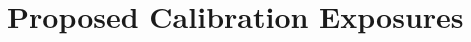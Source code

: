%
%
\section{Proposed Calibration Exposures}

\begingroup                             %
\newcommand{\DspotProjector}{D_{\mbox{\tiny spot}}} %
\newcommand{\OverfillFactor}{f_D}                   %
\newcommand{\DlambdaFilter}{\Delta_\lambda}         %
\newcommand{\DlambdaFlat}{\Delta_{\lambda,\mbox{\tiny flat}}}   %
\newcommand{\DlambdaOffset}{\Delta_{\lambda,\mbox{\tiny hole}}} %
\newcommand{\DlambdaWhite}{\Delta_{\lambda,\mbox{\tiny white}}} %
\newcommand{\Nband}{N_b}                                        %
\newcommand{\NPointPerFilter}{N_{\lambda/\mbox{\tiny filter}}}  %
\newcommand{\NspotCCD}{N_{\mbox{\tiny CCD}}}                    %
\newcommand{\Noffset}{N_{\mbox{\tiny offset}}}                  %
\newcommand{\NFlat}{N_{\mbox{\tiny flat}}}                      %
\newcommand{\Tdark}{t_{\mbox{\tiny dark}}}                      %
\newcommand{\Tflat}{t_{\mbox{\tiny flat}}}                      %
\newcommand{\Tspot}{t_{\mbox{\tiny spot}}}                      %
\newcommand{\FracBandwidth}{f_{\mbox{\tiny bandwidth}}}         %

\newcommand{\DspotProjectorNominal}{0.3\mbox{m}}
\newcommand{\OverfillFactorNominal}{2}
\newcommand{\DlambdaFilterNominal}{1\mbox{\tiny nm}}
\newcommand{\DlambdaFlatNominal}{100\mbox{\tiny nm}}
\newcommand{\DlambdaOffsetNominal}{100\mbox{\tiny nm}}
\newcommand{\DlambdaWhiteNominal}{10\mbox{\tiny nm}}
\newcommand{\NbandNominal}{6}
\newcommand{\NPointPerFilterNominal}{2}
\newcommand{\NspotCCDNominal}{5}
\newcommand{\NoffsetNominal}{9}         %
\newcommand{\NFlatNominal}{10}
\newcommand{\TdarkNominal}{1000\mbox{\tiny s}}
\newcommand{\TflatNominal}{13\mbox{\tiny s}}
\newcommand{\TspotNominal}{45\mbox{\tiny s}}
\newcommand{\FracBandwidthNominal}{0.5}


